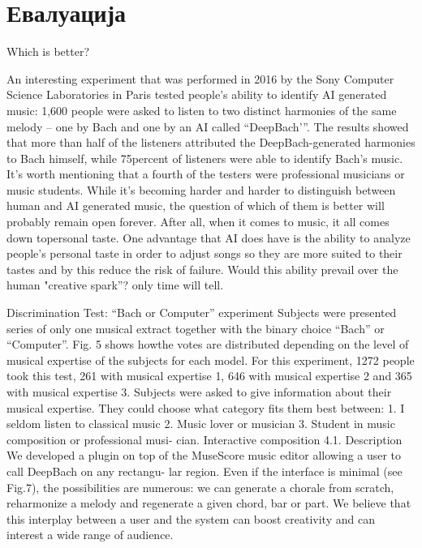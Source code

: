 \chapter{Евалуација}

Which is better?

An interesting experiment that was performed in 2016 by the Sony Computer Science Laboratories in Paris tested people's ability to identify AI generated music: 1,600 people were asked to listen to two distinct harmonies of the same melody – one by Bach and one by an AI called “DeepBach’”. The results showed that more than half of the listeners attributed the DeepBach-generated harmonies to Bach himself, while 75percent  of listeners were able to identify Bach’s music. It’s worth mentioning that a fourth of the testers were professional musicians or music students.
While it’s becoming harder and harder to distinguish between human and AI generated music, the question of which of them is better will probably remain open forever. After all, when it comes to music, it all comes down topersonal taste. One advantage that AI does have is the ability to analyze people's personal taste in order to adjust songs so they are more suited to their tastes and by this reduce the risk of failure. Would this ability prevail over the human "creative spark”? only time will tell.

\cite{Hadjeres2016} Discrimination Test: “Bach or Computer” experiment
Subjects were presented series of only one musical extract together with the binary choice “Bach” or “Computer”. Fig. 5 shows howthe votes are distributed depending on the level of musical expertise of the subjects for each model. For this experiment, 1272 people took this test, 261 with musical expertise 1, 646 with musical expertise 2 and 365 with musical expertise 3.
Subjects were asked to give information about their musical expertise. They could choose what category fits them best between:
1. I seldom listen to classical music
2. Music lover or musician
3. Student in music composition or professional musi- cian.
Interactive composition 4.1. Description
We developed a plugin on top of the MuseScore music editor allowing a user to call DeepBach on any rectangu- lar region. Even if the interface is minimal (see Fig.7), the possibilities are numerous: we can generate a chorale from scratch, reharmonize a melody and regenerate a given chord, bar or part. We believe that this interplay between a user and the system can boost creativity and can interest a wide range of audience.

